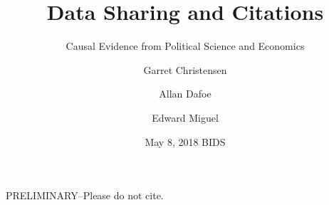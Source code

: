 \documentclass{beamer}
\title[Data Sharing and Citations] %
{Data Sharing and Citations}
\subtitle
{Causal Evidence from Political Science and Economics} %
\author[Christensen, Dafoe, Miguel] %
{Garret Christensen\inst{1} \and Allan Dafoe\inst{2} \and Edward Miguel\inst{3}}
\institute[Universities of Somewhere and Elsewhere] %
{
  \inst{1}%
  Berkeley Institute for Data Science, UC Berkeley
  \and
  \inst{2}%
  Department of Political Science, Yale University
  \and
  \inst{3}%
  Department of Economics, UC Berkeley}
\date[Short Occasion] %
{May 8, 2018 BIDS}
\begin{document}

\begin{frame}
  \titlepage
  \begin{center}
  \begin{large}
  PRELIMINARY--Please do not cite.
  \end{large}
  \end{center}
\end{frame}

%




\end{document}
